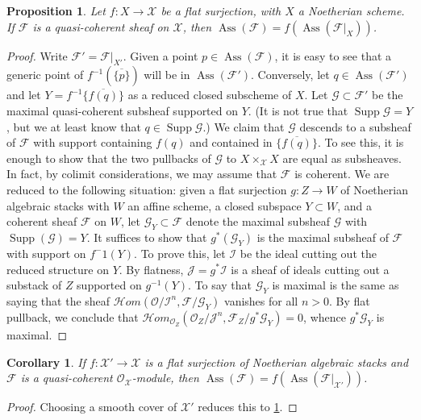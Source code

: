 \documentclass[11pt]{amsart}
\newcommand{\ms}[1]{\mathscr #1}
\newcommand{\widebar}[1]{\overline{#1}}
\newcommand{\shom}{\ms H\!om}
\DeclareMathOperator{\supp}{Supp}
\DeclareMathOperator{\ass}{Ass}
\renewcommand{\[}{[\!\hspace{0.03em}[}
\renewcommand{\]}{]\!\hspace{0.03em}]}
\renewcommand{\(}{(\!\hspace{0.03em}(}
\renewcommand{\)}{)\!\hspace{0.03em})}
\newtheorem{prop}[lem]{Proposition}
\newtheorem{cor}[lem]{Corollary}
\theoremstyle{definition}
\theoremstyle{remark}
\begin{document}
\begin{prop}\label{P:pull back ass} Let $f:X\to\ms X$ be a flat surjection, with $X$ a
Noetherian scheme. If $\ms F$ is a quasi-coherent sheaf on $\ms X$, 
then $\ass(\ms F)=f(\ass(\ms F|_{X}))$.
\end{prop}
\begin{proof} Write $\ms F'=\ms F|_{X'}$.  Given a point $p\in\ass(\ms F)$, it is easy to see that 
a generic point of $f^{-1}(\widebar{\{p\}})$ will be in $\ass(\ms 
F')$.  Conversely, let $q\in\ass(\ms F')$ and let 
$Y=f^{-1}\widebar{\{f(q)\}}$ as a reduced closed subscheme of $X$.  
Let $\ms G\subset\ms F'$ be the maximal quasi-coherent subsheaf supported on $Y$.  
(It is not true that $\supp\ms G=Y$, but we at 
least know that $q\in\supp\ms G$.)  We claim that $\ms G$ descends to 
a subsheaf of $\ms F$ with support containing $f(q)$ and contained in 
$\widebar{\{f(q)\}}$.  To see this, it is enough to show that the two 
pullbacks of $\ms G$ to $X\times_{\ms X}X$ are equal as subsheaves.  
In fact, by colimit considerations, we may assume that $\ms F$ is 
coherent.  We are reduced to the following situation: given a flat surjection 
$g:Z\to W$ of Noetherian algebraic stacks with $W$ an affine scheme, a closed subspace $Y\subset W$, and a coherent sheaf $\ms 
F$ on $W$, let $\ms G_{Y}\subset\ms F$ denote the maximal subsheaf $\ms G$ with 
$\supp(\ms G)=Y$.  It suffices to show that $g^{\ast}(\ms G_{Y})$ is the maximal subsheaf of $\ms F$ with support on $f^-1(Y)$.  To 
prove this, let $\ms I$ be the ideal cutting out the reduced 
structure on $Y$.  By flatness, $\ms J=g^{*}\ms I$ is a sheaf of ideals 
cutting out a substack of $Z$ supported on $g^{-1}(Y)$.  To say 
that $\ms G_{Y}$ is maximal is the same as saying that the sheaf $\shom({\ms O}/\ms 
I^{n},\ms F/\ms G_{Y})$ vanishes for all $n>0$.  By flat pullback, we conclude that 
$\shom_{{\ms O}_{Z}}({\ms O}_{Z}/\ms J^{n},\ms F_{Z}/g^{\ast}\ms G_{Y})=0$, 
whence $g^{\ast}\ms G_{Y}$ is maximal.
\end{proof}

\begin{cor}\label{C:ass flat} If $f:\ms X'\to\ms X$ is a flat 
surjection of Noetherian algebraic stacks and $\ms F$ is a 
quasi-coherent ${\ms O}_{\ms X}$-module, then $\ass(\ms F)=f(\ass(\ms 
F|_{\ms X'}))$.
\end{cor}
\begin{proof} Choosing a smooth cover of $\ms X'$ reduces this to 
\ref{P:pull back ass}.
\end{proof}
\end{document}
